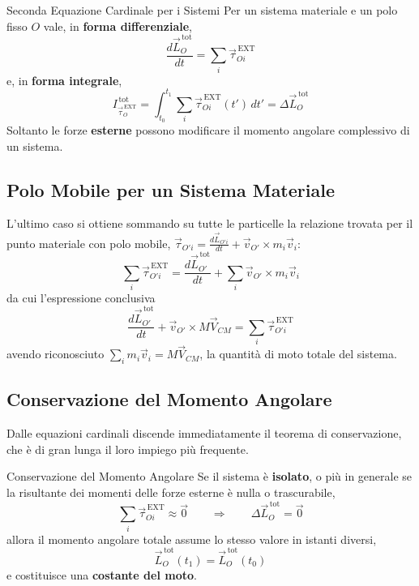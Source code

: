 \begin{teorema}{Seconda Equazione Cardinale per i Sistemi}
Per un sistema materiale e un polo fisso $O$ vale, in \textbf{forma differenziale},
\begin{equation}
    \frac{d\vec{L}_O^{\,\text{tot}}}{dt} = \sum_i \vec{\tau}_{Oi}^{\,\text{EXT}}
\end{equation}
e, in \textbf{forma integrale},
\begin{equation}
    I^{\,\text{tot}}_{\vec{\tau}_O^{\,\text{EXT}}}
    = \int_{t_0}^{t_1} \sum_i \vec{\tau}_{Oi}^{\,\text{EXT}}(t') \, dt'
    = \Delta\vec{L}_O^{\,\text{tot}}
\end{equation}
Soltanto le forze \textbf{esterne} possono modificare il momento angolare complessivo di un sistema.
\end{teorema}

\subsection{Polo Mobile per un Sistema Materiale}

L'ultimo caso si ottiene sommando su tutte le particelle la relazione trovata per il punto materiale con polo mobile, $\vec{\tau}_{O'i} = \frac{d\vec{L}_{O'i}}{dt} + \vec{v}_{O'} \times m_i\vec{v}_i$:
\begin{equation}
    \sum_i \vec{\tau}_{O'i}^{\,\text{EXT}}
    = \frac{d\vec{L}_{O'}^{\,\text{tot}}}{dt} + \sum_i \vec{v}_{O'} \times m_i \vec{v}_i
\end{equation}
da cui l'espressione conclusiva
\begin{equation}
    \frac{d\vec{L}_{O'}^{\,\text{tot}}}{dt} + \vec{v}_{O'} \times M\vec{V}_{CM}
    = \sum_i \vec{\tau}_{O'i}^{\,\text{EXT}}
\end{equation}
avendo riconosciuto $\sum_i m_i\vec{v}_i = M\vec{V}_{CM}$, la quantità di moto totale del sistema.

\subsection{Conservazione del Momento Angolare}

Dalle equazioni cardinali discende immediatamente il teorema di conservazione, che è di gran lunga il loro impiego più frequente.

\begin{teorema}{Conservazione del Momento Angolare}
Se il sistema è \textbf{isolato}, o più in generale se la risultante dei momenti delle forze esterne è nulla o trascurabile,
\begin{equation*}
    \sum_i \vec{\tau}_{Oi}^{\,\text{EXT}} \approx \vec{0}
    \qquad \Longrightarrow \qquad
    \Delta\vec{L}_O^{\,\text{tot}} = \vec{0}
\end{equation*}
allora il momento angolare totale assume lo stesso valore in istanti diversi,
\begin{equation}
    \vec{L}_O^{\,\text{tot}}(t_1) = \vec{L}_O^{\,\text{tot}}(t_0)
\end{equation}
e costituisce una \textbf{costante del moto}.
\end{teorema}

